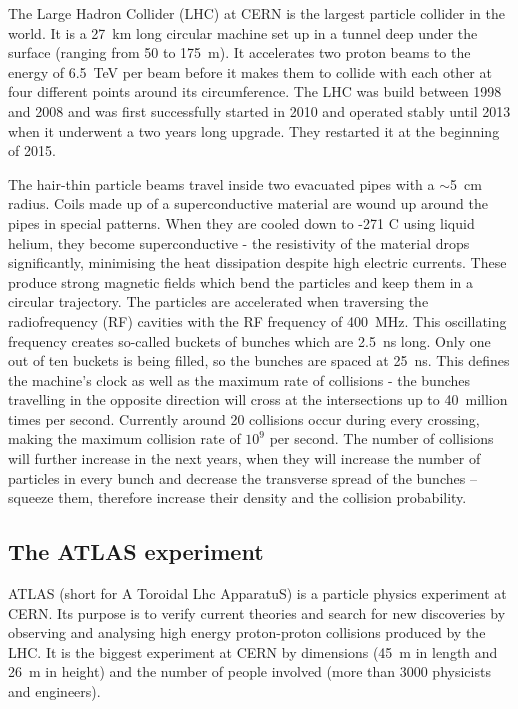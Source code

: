 \documentclass[twoside,12pt]{packages/mytustyle}  %
\let\origdescription\description
\renewenvironment{description}{
  \setlength{\leftmargini}{0em}
  \origdescription
  \setlength{\itemindent}{0em}
  \setlength{\labelsep}{\textwidth}
}
{\endlist}
\begin{document}
\begin{description}
\item[The Large Hadron Collider]
The Large Hadron Collider (LHC) at CERN is the largest particle collider in the world. It is a 27~km long circular machine set up in a tunnel deep under the surface (ranging from 50 to 175~m). It accelerates two proton beams to the energy of 6.5~TeV per beam before it makes them to collide with each other at four different points around its circumference. The LHC was build between 1998 and 2008 and was first successfully started in 2010 and operated stably until 2013 when it underwent a two years long upgrade. They restarted it at the beginning of 2015.

The hair-thin particle beams travel inside two evacuated pipes with a $\sim$5~cm radius. Coils made up of a superconductive material are wound up around the pipes in special patterns. When they are cooled down to -271 \textdegree C using liquid helium, they become superconductive - the resistivity of the material drops significantly, minimising the heat dissipation despite high electric currents. These produce strong magnetic fields which bend the particles and keep them in a circular trajectory. The particles are accelerated when traversing the radiofrequency (RF) cavities with the RF frequency of 400~MHz. This oscillating frequency creates so-called buckets of bunches which are 2.5~ns long. Only one out of ten buckets is being filled, so the bunches are spaced at 25~ns. This defines the machine's clock as well as the maximum rate of collisions - the bunches travelling in the opposite direction will cross at the intersections up to 40~million times per second. Currently around 20 collisions occur during every crossing, making the maximum collision rate of $10^9$ per second. The number of collisions will further increase in the next years, when they will increase the number of particles in every bunch and decrease the transverse spread of the bunches -- squeeze them, therefore increase their density and the collision probability.
\end{description}

\subsection{The ATLAS experiment}
ATLAS (short for A Toroidal Lhc ApparatuS) is a particle physics experiment at CERN. Its purpose is to verify current theories and search for new discoveries by observing and analysing high energy proton-proton collisions produced by the LHC. It is the biggest experiment at CERN by dimensions (45~m in length and 26~m in height) and the number of people involved (more than 3000 physicists and engineers).
\end{document}
